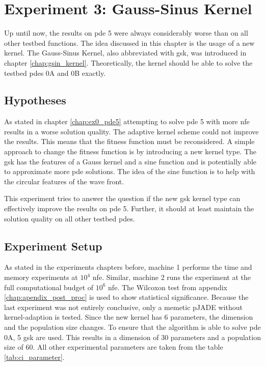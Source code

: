 \documentclass[./\jobname.tex]{subfiles}
\begin{document}
\chapter {Experiment 3: Gauss-Sinus Kernel}
\label{chap:experimet_3}

Up until now, the results on \gls{pde} 5 were always considerably worse than on all other testbed functions. The idea discussed in this chapter is the usage of a new kernel. The Gauss-Sinus Kernel, also abbreviated with \gls{gsk}, was introduced in chapter \ref{chap:gsin_kernel}. Theoretically, the kernel should be able to solve the testbed \gls{pde}s 0A and 0B exactly.  

\section{Hypotheses}
As stated in chapter \ref{chap:ex0_pde5} attempting to solve \gls{pde} 5 with more \gls{nfe} results in a worse solution quality. The adaptive kernel scheme could not improve the results. This means that the fitness function must be reconsidered. A simple approach to change the fitness function is by introducing a new kernel type. The \gls{gsk} has the features of a Gauss kernel and a sine function and is potentially able to approximate more \gls{pde} solutions. The idea of the sine function is to help with the circular features of the wave front. 

This experiment tries to answer the question if the new \gls{gsk} kernel type can effectively improve the results on \gls{pde} 5. Further, it should at least maintain the solution quality on all other testbed \gls{pde}s. 

\section{Experiment Setup}

As stated in the experiments chapters before, machine 1 performs the time and memory experiments at $10^4$ \gls{nfe}. Similar, machine 2 runs the experiment at the full computational budget of $10^6$ \gls{nfe}. The Wilcoxon test from appendix \ref{chap:apendix_post_proc} is used to show statistical significance. Because the last experiment was not entirely conclusive, only a memetic pJADE without kernel-adaption is tested. Since the new kernel has 6 parameters, the dimension and the population size changes. To ensure that the algorithm is able to solve \gls{pde} 0A, 5 \gls{gsk} are used. This results in a dimension of 30 parameters and a population size of 60. All other experimental parameters are taken from the table \ref{tab:ci_parameter}. 
\end{document}
